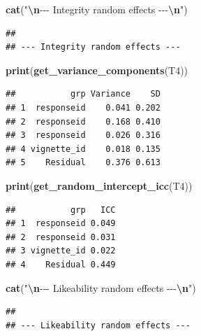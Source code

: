 \documentclass[
]{article}
\newenvironment{Shaded}{\begin{snugshade}}{\end{snugshade}}
\newcommand{\FunctionTok}[1]{\textcolor[rgb]{0.13,0.29,0.53}{\textbf{#1}}}
\newcommand{\NormalTok}[1]{#1}
\newcommand{\SpecialCharTok}[1]{\textcolor[rgb]{0.81,0.36,0.00}{\textbf{#1}}}
\newcommand{\StringTok}[1]{\textcolor[rgb]{0.31,0.60,0.02}{#1}}
\begin{document}
\begin{Shaded}
\begin{Highlighting}[]
\FunctionTok{cat}\NormalTok{(}\StringTok{"}\SpecialCharTok{\textbackslash{}n}\StringTok{{-}{-}{-} Integrity random effects {-}{-}{-}}\SpecialCharTok{\textbackslash{}n}\StringTok{"}\NormalTok{)}
\end{Highlighting}
\end{Shaded}

\begin{verbatim}
## 
## --- Integrity random effects ---
\end{verbatim}

\begin{Shaded}
\begin{Highlighting}[]
\FunctionTok{print}\NormalTok{(}\FunctionTok{get\_variance\_components}\NormalTok{(T4))}
\end{Highlighting}
\end{Shaded}

\begin{verbatim}
##           grp Variance    SD
## 1  responseid    0.041 0.202
## 2  responseid    0.168 0.410
## 3  responseid    0.026 0.316
## 4 vignette_id    0.018 0.135
## 5    Residual    0.376 0.613
\end{verbatim}

\begin{Shaded}
\begin{Highlighting}[]
\FunctionTok{print}\NormalTok{(}\FunctionTok{get\_random\_intercept\_icc}\NormalTok{(T4))}
\end{Highlighting}
\end{Shaded}

\begin{verbatim}
##           grp   ICC
## 1  responseid 0.049
## 2  responseid 0.031
## 3 vignette_id 0.022
## 4    Residual 0.449
\end{verbatim}

\begin{Shaded}
\begin{Highlighting}[]
\FunctionTok{cat}\NormalTok{(}\StringTok{"}\SpecialCharTok{\textbackslash{}n}\StringTok{{-}{-}{-} Likeability random effects {-}{-}{-}}\SpecialCharTok{\textbackslash{}n}\StringTok{"}\NormalTok{)}
\end{Highlighting}
\end{Shaded}

\begin{verbatim}
## 
## --- Likeability random effects ---
\end{verbatim}
\end{document}
